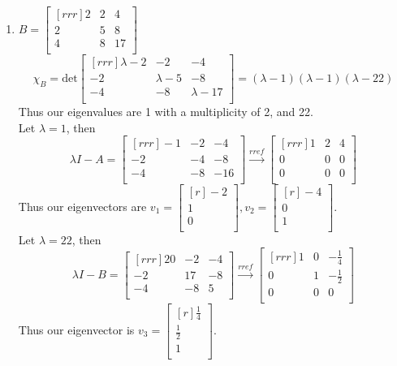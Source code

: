 \documentclass[12pt]{article}
\theoremstyle{definition}
\theoremstyle{plain}
\begin{document}
\begin{enumerate}
\begin{enumerate}
	\item $B=\begin{bmatrix}[rrr]2&2&4\\2&5&8\\4&8&17\\\end{bmatrix}$
	\[ \chi_B=\mathrm{det}\begin{bmatrix}[rrr]\lambda-2&-2&-4\\-2&\lambda-5&-8\\-4&-8&\lambda-17\\\end{bmatrix} = (\lambda-1)(\lambda-1)(\lambda-22) \]
	Thus our eigenvalues are 1 with a multiplicity of 2, and 22.\\
	Let $\lambda=1$, then
	\[ \lambda I-A=\begin{bmatrix}[rrr]-1&-2&-4\\-2&-4&-8\\-4&-8&-16\\\end{bmatrix}\xrightarrow[]{rref}\begin{bmatrix}[rrr]1&2&4\\0&0&0\\0&0&0\\\end{bmatrix} \]
	Thus our eigenvectors are $v_1=\begin{bmatrix}[r]-2\\1\\0\\\end{bmatrix},v_2=\begin{bmatrix}[r]-4\\0\\1\\\end{bmatrix}$.\\
	Let $\lambda=22$, then
	\[ \lambda I-B = \begin{bmatrix}[rrr]20&-2&-4\\-2&17&-8\\-4&-8&5\\\end{bmatrix}\xrightarrow[]{rref}\begin{bmatrix}[rrr]1&0&-\frac{1}{4}\\0&1&-\frac{1}{2}\\0&0&0\\\end{bmatrix} \]
	Thus our eigenvector is $v_3=\begin{bmatrix}[r]\frac{1}{4}\\\frac{1}{2}\\1\\\end{bmatrix}$.\\

\end{enumerate}
\end{enumerate}
\end{document}
